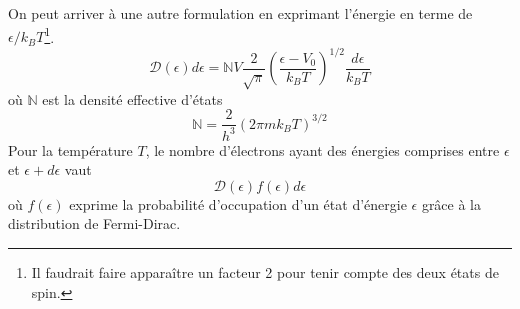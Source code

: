 On peut arriver à une autre formulation en exprimant l'énergie en 
terme de $\epsilon/k_BT$\footnote{Il faudrait faire apparaître un 
facteur 2 pour tenir compte des deux états de spin.}. 
\begin{equation}
\mathcal{D}(\epsilon)d\epsilon = \mathbb{N}V\frac{2}{\sqrt{\pi}}
\left( \frac{\epsilon-V_0}{k_BT}\right)^{1/2}\frac{d\epsilon}{k_BT}
\end{equation}
où $\mathbb{N}$ est la densité effective d'états
\begin{equation}
\mathbb{N} = \frac{2}{h^3}(2\pi m k_BT)^{3/2}
\end{equation}
Pour la température $T$, le nombre d'électrons ayant des énergies 
comprises entre $\epsilon$ et $\epsilon+d\epsilon$ vaut 
\begin{equation}
\mathcal{D}(\epsilon)f(\epsilon)d\epsilon
\end{equation}
où $f(\epsilon)$ exprime la probabilité d'occupation d'un état 
d'énergie $\epsilon$ grâce à la distribution de Fermi-Dirac.\\

